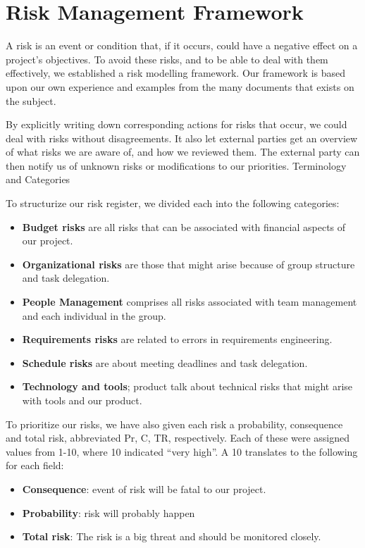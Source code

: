 \chapter{Risk Management Framework}
A risk is an event or condition that, if it occurs, could have a
negative effect on a project's objectives. To avoid these risks, and to be
able to deal with them effectively, we established a risk modelling framework.
Our framework is based upon our own experience and examples from the many
documents that exists on the subject.

By explicitly writing down corresponding actions for risks that occur,
we could deal with risks without disagreements. It also let external
parties get an overview of what risks we are aware of, and how we
reviewed them. The external party can then notify us of unknown risks
or modifications to our priorities. 
Terminology and Categories

To structurize our risk register, we divided each into the following
categories:
\begin{itemize}
    \item \textbf{Budget risks} are all risks that can be associated with
        financial aspects of our project.
    \item \textbf{Organizational risks} are those that might arise because of
    group structure and task delegation.
    \item \textbf{People Management} comprises all risks associated with team
        management and each individual in the group.
    \item \textbf{Requirements risks} are related to errors in requirements
        engineering.
    \item \textbf{Schedule risks} are about meeting deadlines and task
        delegation.
    \item \textbf{Technology and tools}; product talk about technical risks that
        might arise with tools and our product.
\end{itemize}

To prioritize our risks, we have also given each risk a probability,
consequence and total risk, abbreviated Pr, C, TR, respectively. Each
of these were assigned values from 1-10, where 10 indicated
``very high''. A 10 translates to
the following for each field:
\begin{itemize}
    \item \textbf{Consequence}: event of risk will be fatal to our project.
    \item \textbf{Probability}: risk will probably happen
    \item \textbf{Total risk}: The risk is a big threat and should be monitored closely.
\end{itemize}


